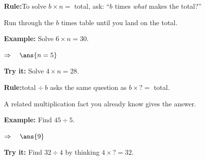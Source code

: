 \documentclass[12pt]{article}
\begin{document}


\begin{formulabox}
\textbf{Rule:}\quad To solve $b \times n = $ total, ask: ``$b$ times \emph{what} makes the total?''\par
Run through the $b$ times table until you land on the total.
\end{formulabox}

\begin{examplebox}
\textbf{Example:} Solve $6 \times n = 30$.

$\Rightarrow\quad\ans{n = 5}$
\end{examplebox}

\begin{tryitbox}
\textbf{Try it:} Solve $4 \times n = 28$.\\[2pt]
\end{tryitbox}


\begin{formulabox}
\textbf{Rule:}\quad total $\div\ b$ asks the same question as $b \times \textbf{?} = $ total.\par
A related multiplication fact you already know gives the answer.
\end{formulabox}

\begin{examplebox}
\textbf{Example:} Find $45 \div 5$.

$\Rightarrow\quad\ans{9}$
\end{examplebox}

\begin{tryitbox}
\textbf{Try it:} Find $32 \div 4$ by thinking $4 \times \textbf{?} = 32$.\\[2pt]
\end{tryitbox}

\end{document}
